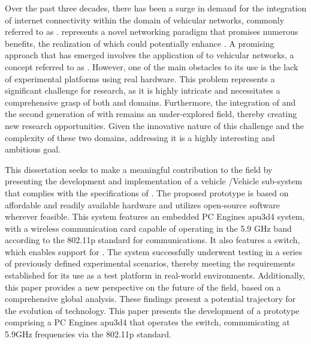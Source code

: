 
%





Over the past three decades, there has been a surge in demand for the integration of internet connectivity within the domain of vehicular networks, commonly referred to as . 
 represents a novel networking paradigm that promises numerous benefits, the realization of which could potentially enhance . 
A promising approach that has emerged involves the application of  to vehicular networks, a concept referred to as . 
However, one of the main obstacles to its use is the lack of experimental platforms using real hardware.
This problem represents a significant challenge for  research, as it is highly intricate and necessitates a comprehensive grasp of both  and  domains. 
Furthermore, the integration of  and the second generation of  with  remains an under-explored field, thereby creating new research opportunities. 
Given the innovative nature of this challenge and the complexity of these two domains, addressing it is a highly interesting and ambitious goal.

This dissertation seeks to make a meaningful contribution to the field by presenting the development and implementation of a vehicle /Vehicle  sub-system that complies with the specifications of .
The proposed prototype is based on affordable and readily available hardware and utilizes open-source software wherever feasible. 
This system features an embedded PC Engines apu3d4 system, with a wireless communication card capable of operating in the 5.9 GHz band according to the  802.11p standard for  communications. It also  features a  switch, which enables support for . 
The system successfully underwent testing in a series of previously defined experimental scenarios, thereby meeting the requirements established for its use as a test platform in real-world environments. 
Additionally, this paper provides a new perspective on the future of the  field, based on a comprehensive global analysis. These findings present a potential trajectory for the evolution of  technology. This paper presents the development of a prototype comprising a PC Engines apu3d4 that operates the   switch, communicating at 5.9GHz frequencies via the 802.11p standard. 


